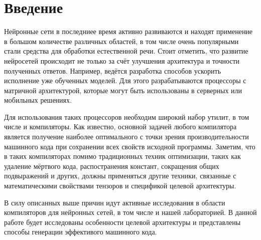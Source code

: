 \section{Введение}
\label{sec:Intro} 

Нейронные сети в последниее время активно развиваются и находят применение
в большом количестве различных областей, в том числе очень популярными стали
средства для обработки естественной речи. Стоит отметить, что развитие
нейросетей происходит не только за счёт улучшения архитектура и точности
полученных ответов. Например, ведётся разработка способов ускорить исполнение
уже обученных моделей. Для этого разрабатываются процессоры с матричной
архитектурой, которые могут быть использованы в серверных или мобильных
решениях.

Для использования таких процессоров необходим широкий набор утилит, в том
числе и компиляторы. Как известно, основной задачей любого компилятора
является получение наиболее оптимального с точки зрения производительности
машинного кода при сохранении всех свойств исходной программы. Заметим, что в
таких компиляторах помимо традиционных техник оптимизации, таких как удаление
мёртвого кода, распостранения констант, сокращения общих подвыражений и других,
должны применяться другие техники, связанные с математическими свойствами
тензоров и спецификой целевой архитектуры.

В силу описанных выше причин идут активные исследования в области компиляторов
для нейронных сетей, в том числе и нашей лабораторией. В данной работе будет
исследованы особенности целевой архитектуры и представлены способы генерации
эффективого машинного кода.

\newpage
